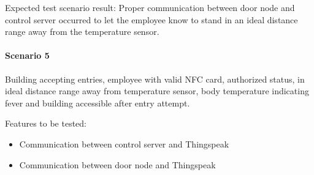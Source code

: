 \noindent
Expected test scenario result: Proper communication between door node and
control server occurred to let the employee know to stand in an ideal distance
range away from the temperature sensor.

\paragraph{Scenario 5}
Building accepting entries, employee with valid NFC card, authorized status, in
ideal distance range away from temperature sensor, body temperature indicating
fever and building accessible after entry attempt.

\noindent
Features to be tested:
\begin{itemize}
    \item Communication between control server and Thingspeak
    \item Communication between door node and Thingspeak
\end{itemize}


